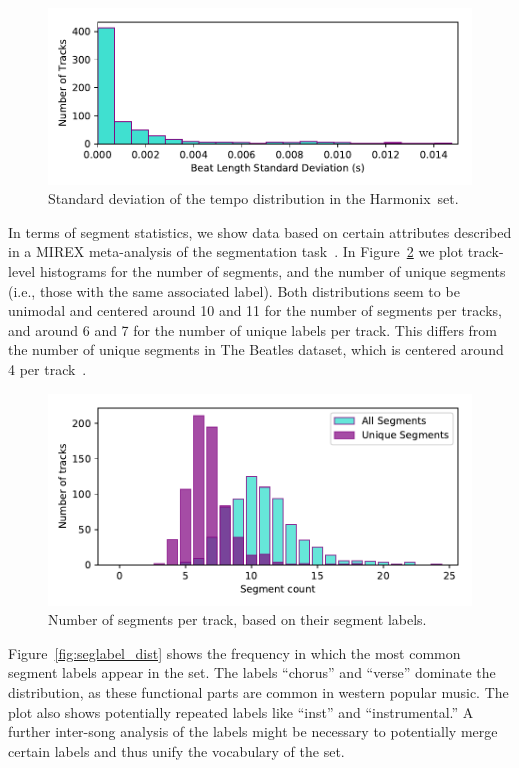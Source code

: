\documentclass{article}
\newcommand{\setName}{Harmonix}
\begin{document}
\begin{figure}
    \centerline{\includegraphics[width=\columnwidth]{figs/BPM_std.pdf}}
    \caption{Standard deviation of the tempo distribution in the \setName~set.}
    \label{fig:BPM_std}
\end{figure}

In terms of segment statistics, we show data based on certain attributes described in a MIREX meta-analysis of the segmentation task~\cite{Smith2013}.
In Figure~\ref{fig:segment_count} we plot track-level histograms for the number of segments, and the number of unique segments (i.e., those with the same associated label).
Both distributions seem to be unimodal and centered around 10 and 11 for the number of segments per tracks, and around 6 and 7 for the number of unique labels per track.
This differs from the number of unique segments in The Beatles dataset, which is centered around 4 per track~\cite{Nieto2014}.

\begin{figure}
    \centerline{\includegraphics[width=\columnwidth]{figs/segment_label_count.pdf}}
    \caption{Number of segments per track, based on their segment labels.}
    \label{fig:segment_count}
\end{figure}

Figure~\ref{fig:seglabel_dist} shows the frequency in which the most common segment labels appear in the set.
The labels ``chorus'' and ``verse'' dominate the distribution, as these functional parts are common in western popular music.
The plot also shows potentially repeated labels like ``inst'' and ``instrumental.''
A further inter-song analysis of the labels might be necessary to potentially merge certain labels and thus unify the vocabulary of the set.
\end{document}
